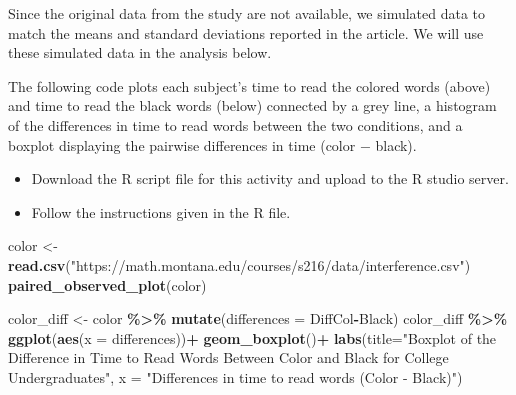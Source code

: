 \documentclass[
]{report}
\newenvironment{Shaded}{\begin{snugshade}}{\end{snugshade}}
\newcommand{\AttributeTok}[1]{\textcolor[rgb]{0.13,0.29,0.53}{#1}}
\newcommand{\FunctionTok}[1]{\textcolor[rgb]{0.13,0.29,0.53}{\textbf{#1}}}
\newcommand{\NormalTok}[1]{#1}
\newcommand{\OtherTok}[1]{\textcolor[rgb]{0.56,0.35,0.01}{#1}}
\newcommand{\SpecialCharTok}[1]{\textcolor[rgb]{0.81,0.36,0.00}{\textbf{#1}}}
\newcommand{\StringTok}[1]{\textcolor[rgb]{0.31,0.60,0.02}{#1}}
\begin{document}
Since the original data from the study are not available, we simulated data to match the means and standard deviations reported in the article. We will use these simulated data in the analysis below.

The following code plots each subject's time to read the colored words (above) and time to read the black words (below) connected by a grey line, a histogram of the differences in time to read words between the two conditions, and a boxplot displaying the pairwise differences in time (color \(-\) black).

\begin{itemize}
\item
  Download the R script file for this activity and upload to the R studio server.
\item
  Follow the instructions given in the R file.
\end{itemize}

\begin{Shaded}
\begin{Highlighting}[]
\NormalTok{color }\OtherTok{\textless{}{-}} \FunctionTok{read.csv}\NormalTok{(}\StringTok{"https://math.montana.edu/courses/s216/data/interference.csv"}\NormalTok{)}
\FunctionTok{paired\_observed\_plot}\NormalTok{(color)}

\NormalTok{color\_diff }\OtherTok{\textless{}{-}}\NormalTok{ color }\SpecialCharTok{\%\textgreater{}\%} 
  \FunctionTok{mutate}\NormalTok{(}\AttributeTok{differences =}\NormalTok{ DiffCol}\SpecialCharTok{{-}}\NormalTok{Black)}
\NormalTok{color\_diff }\SpecialCharTok{\%\textgreater{}\%}
  \FunctionTok{ggplot}\NormalTok{(}\FunctionTok{aes}\NormalTok{(}\AttributeTok{x =}\NormalTok{ differences))}\SpecialCharTok{+}
  \FunctionTok{geom\_boxplot}\NormalTok{()}\SpecialCharTok{+}
  \FunctionTok{labs}\NormalTok{(}\AttributeTok{title=}\StringTok{"Boxplot of the Difference in Time to Read Words }
\StringTok{       Between Color and Black for College Undergraduates"}\NormalTok{,}
       \AttributeTok{x =} \StringTok{"Differences in time to read words (Color {-} Black)"}\NormalTok{)}
\end{Highlighting}
\end{Shaded}
\end{document}
